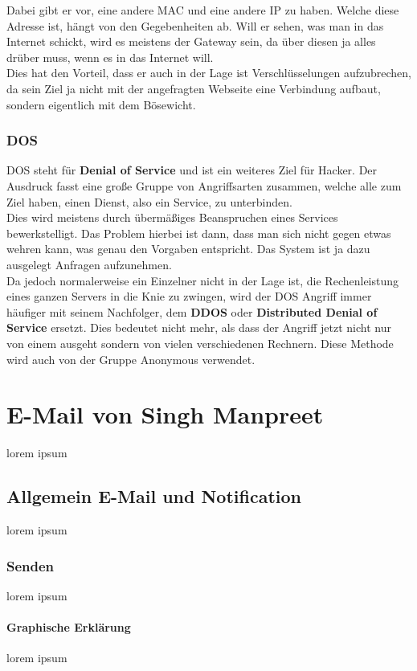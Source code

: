 \documentclass[12pt,a4paper]{report}
\begin{document}
Dabei gibt er vor, eine andere MAC und eine andere IP zu haben. Welche diese Adresse ist, hängt von den Gegebenheiten ab. Will er sehen, was man in das Internet schickt, wird es meistens der Gateway sein, da über diesen ja alles drüber muss, wenn es in das Internet will.\\
Dies hat den Vorteil, dass er auch in der Lage ist Verschlüsselungen aufzubrechen, da sein Ziel ja nicht mit der angefragten Webseite eine Verbindung aufbaut, sondern eigentlich mit dem Bösewicht. 

\subsection{DOS}
DOS steht für \textbf{Denial of Service} und ist ein weiteres Ziel für Hacker. Der Ausdruck fasst eine große Gruppe von Angriffsarten zusammen, welche alle zum Ziel haben, einen Dienst, also ein Service, zu unterbinden.\\
Dies wird meistens durch übermäßiges Beanspruchen eines Services bewerkstelligt. Das Problem hierbei ist dann, dass man sich nicht gegen etwas wehren kann, was genau den Vorgaben entspricht. Das System ist ja dazu ausgelegt Anfragen aufzunehmen.\\

Da jedoch normalerweise ein Einzelner nicht in der Lage ist, die Rechenleistung eines ganzen Servers in die Knie zu zwingen, wird der DOS Angriff immer häufiger mit seinem Nachfolger, dem \textbf{DDOS} oder \textbf{Distributed Denial of Service} ersetzt. Dies bedeutet nicht mehr, als dass der Angriff jetzt nicht nur von einem ausgeht sondern von vielen verschiedenen Rechnern. Diese Methode wird auch von der Gruppe Anonymous verwendet.

\chapter{E-Mail von Singh Manpreet}
lorem ipsum
\section{Allgemein E-Mail und Notification}
lorem ipsum
\subsection{Senden}
lorem ipsum
\subsubsection{Graphische Erklärung}
lorem ipsum
\end{document}
